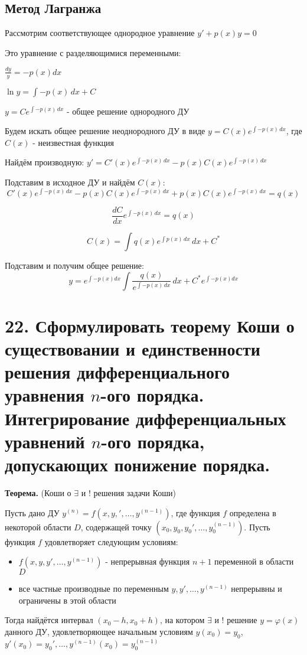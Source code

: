 \documentclass[11pt]{article}
\begin{document}
\subsection*{Метод Лагранжа}
\par Рассмотрим соответствующее однородное уравнение $y' + p(x)y = 0$
\par Это уравнение с разделяющимися переменными:
\par $\frac{dy}{y} = -p(x)dx$
\par $\ln y = \int -p(x) \, dx + C$
\par $y = Ce^{\int -p(x) \, dx}$ - общее решение однородного ДУ
\par Будем искать общее решение неоднородного ДУ в виде $y = C(x)e^{\int -p(x) \, dx}$, где $C(x)$ - неизвестная функция
\par Найдём производную: $y' = C'(x)e^{\int -p(x) \, dx} - p(x)C(x)e^{\int -p(x) \, dx}$
\par Подставим в исходное ДУ и найдём $C(x)$: $$C'(x)e^{\int -p(x) \, dx} - p(x)C(x)e^{\int -p(x) \, dx} + p(x)C(x)e^{\int -p(x) \, dx} = q(x)$$
\par $$\frac{dC}{dx}e^{\int -p(x) \, dx} = q(x)$$
\par $$C(x) = \int q(x)e^{\int p(x) \, dx } \, dx + C^*$$
\par Подставим и получим общее решение:$$y = e^{\int -p(x)dx}\int \frac{q(x)}{e^{\int -p(x) \, dx}} \, dx + C^*e^{\int -p(x)dx}$$

\section*{22. Сформулировать теорему Коши о существовании и единственности решения дифференциального уравнения $n$-ого порядка. Интегрирование дифференциальных уравнений $n$-ого порядка, допускающих понижение порядка.}
\par\textbf{Теорема.} (Коши о $\exists$ и $!$ решения задачи Коши)
\par Пусть дано ДУ $y^{(n)} = f(x, y, ', \dots, y^{(n-1)})$, где функция $f$ определена в некоторой области $D$, содержащей точку $(x_{0}, y_{0}, y_{0}', \dots, y_{0}^{(n-1)})$. Пусть функция $f$ удовлетворяет следующим условиям:
\begin{itemize}
    \item $f(x, y, y', \dots, y^{(n-1)})$ - непрерывная функция $n+1$ переменной в области $D$
    \item все частные производные по переменным $y, y', \dots, y^{(n-1)}$ непрерывны и ограничены в этой области
\end{itemize}
\par Тогда найдётся интервал $(x_{0}-h, x_{0}+h)$, на котором $\exists$ и $!$ решение $y = \varphi(x)$ данного ДУ, удовлетворяющее начальным условиям $y(x_{0}) = y_{0}$, $y'(x_{0}) = y_{0}', \dots, y^{(n-1)}(x_{0}) = y_{0}^{(n-1)}$
\end{document}
